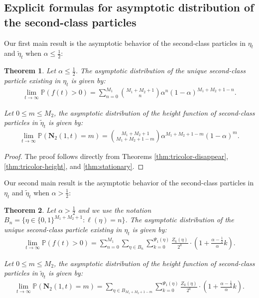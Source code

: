 \documentclass[12pt,a4paper]{amsart}
\newtheorem{theorem}{Theorem} %
\theoremstyle{remark}
\numberwithin{equation}{section} \numberwithin{theorem}{section}
\begin{document}
\subsection{Explicit formulas for asymptotic distribution of the second-class particles}
\label{ssec:constant-formulas}
Our first main result is the asymptotic behavior of the second-class particles in $\eta_t$ and $\tilde{\eta}_{t}$ when $\alpha\leq \frac12$:
\begin{theorem}
\label{thm:one-shock-stationary-4.1}
Let $\alpha\leq \frac12$. The asymptotic distribution  of the unique second-class particle existing in $\eta_t$ is given by:
\begin{align}
\label{eq:one-shock-exist-1}
\lim_{t\to\infty}\mathbb{P}(f(t)>0)=\sum_{n=0}^{M_1}\binom{M_1+M_2+1}{n}\alpha^n(1-\alpha)^{M_1+M_2+1-n}.
\end{align}

Let $0 \leq m \leq M_2$, the asymptotic distribution  of the height function of second-class particles in $\tilde{\eta}_{t}$ is given by:
\begin{align}
\label{eq:one-shock-height-1}
\lim_{t\to\infty}\mathbb{P}(\mathbf{N}_{2} (1,t)=m)=\binom{M_1+M_2+1}{M_1+M_2+1-m}\alpha^{M_1+M_2+1-m}(1-\alpha)^{m}.
\end{align}
\end{theorem}

\begin{proof}
The proof follows directly from Theorems \ref{thm:tricolor-disappear}, \ref{thm:tricolor-height}, and \ref{thm:stationary}.
\end{proof}

Our second main result is the asymptotic behavior of the second-class particles in $\eta_t$ and $\tilde{\eta}_{t}$ when $\alpha > \frac12$:

\begin{theorem}
\label{thm:one-shock-stationary-4.2}
Let $\alpha > \frac12$ and we use the notation $B_{n}=\{\eta \in \{0,1\}^{M_1+M_2+1}: \ell(\eta)=n\}$. The asymptotic distribution of the unique second-class particle existing in $\eta_t$ is given by:
\begin{align}
\label{eq:one-shock-exist-2}
\lim_{t \to \infty } \mathbb{P}(f(t)>0)=
\sum_{n=0}^{M_1}\sum_{\eta \in B_{n}}\sum_{k=0}^{\Psi_{1}(\eta)} \frac{Z_k(\eta)}{2^k} \cdot \left(1+\frac{\alpha-\frac12}{\alpha}k\right).
\end{align}

Let $0 \leq m \leq M_2$, the asymptotic distribution  of the height function of second-class particles in $\tilde{\eta}_{t}$ is given by:
\begin{align}
\label{eq:one-shock-height-2}
\lim_{t\to\infty}\mathbb{P}(\mathbf{N}_{2} (1,t)=m)
=\sum_{\eta \in B_{M_1+M_2+1-m}}\sum_{k=0}^{\Psi_{1}(\eta)} \frac{Z_k(\eta)}{2^k} \cdot \left(1+\frac{\alpha-\frac12}{\alpha}k\right).
\end{align}
\end{theorem}
\end{document}
